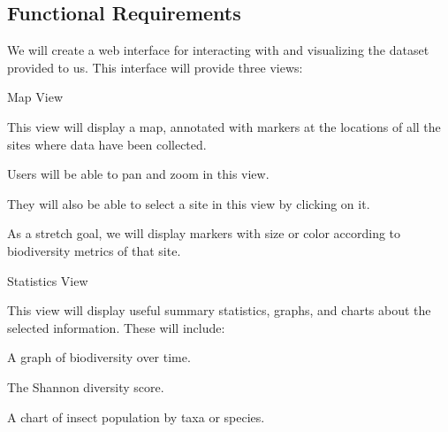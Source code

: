 \subsection{Functional Requirements}

\par We will create a web interface for interacting with and visualizing the dataset provided to us.
This interface will provide three views:

\begin{list}{-}{} %

\item Map View

\begin{list}{-}{}
\item This view will display a map, annotated with markers at the locations of all the sites where data have been collected.
\item Users will be able to pan and zoom in this view.
\item They will also be able to select a site in this view by clicking on it.
\item As a stretch goal, we will display markers with size or color according to biodiversity metrics of that site.
\end{list}

\item Statistics View

\begin{list}{-}{}
\item This view will display useful summary statistics, graphs, and charts about the selected information.
These will include:
\begin{list}{-}{}
\item A graph of biodiversity over time.
\item The Shannon diversity score.
\item A chart of insect population by taxa or species.
\end{list}
\end{list}


\end{list}

